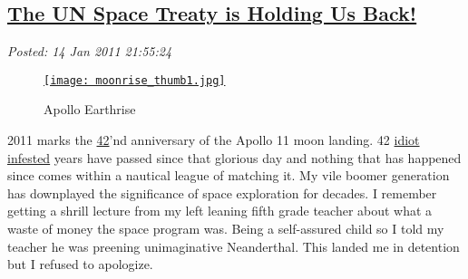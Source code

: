 %

\subsection*{\href{http://bakerjd99.wordpress.com/2011/01/14/the-un-space-treaty-is-holding-us-back/}{The UN Space Treaty is Holding Us Back!}}


\noindent\emph{Posted: 14 Jan 2011 21:55:24}
\vspace{6pt}




\captionsetup[figure]{labelformat=empty}
\begin{figure}[htbp]
\centering
\href{http://bakerjd99.files.wordpress.com/2011/01/moonrise1.jpg}{\texttt{[image: moonrise\_thumb1.jpg]}}
\caption{Apollo  Earthrise}
\label{fig:1022X0}
\end{figure} 

2011 marks the \href{http://www.youtube.com/watch?v=aboZctrHfK8}{42}'nd
anniversary of the Apollo 11 moon landing. 42
\href{http://www.newser.com/story/comments/64908/moon-landing-denier-exposed-as-a-cheat.html}{idiot
infested} years have passed since that glorious day and nothing that has
happened since comes within a nautical league of matching it. My vile
boomer generation has downplayed the significance of space exploration
for decades. I remember getting a shrill lecture from my left leaning
fifth grade teacher about what a waste of money the space program was.
Being a self-assured child so I told my teacher he was preening
unimaginative Neanderthal. This landed me in detention but I refused to
apologize.

